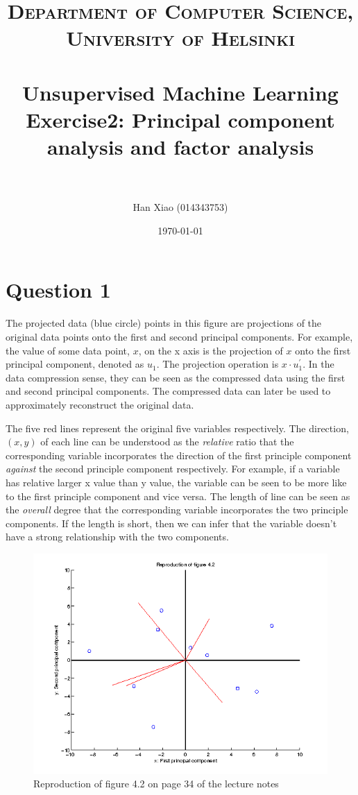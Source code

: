 \documentclass[paper=a4, fontsize=11pt]{scrartcl} %
\title{	
\normalfont \normalsize 
\textsc{Department of Computer Science, University of Helsinki} \\ [25pt] %
\horrule{0.5pt} \\[0.4cm] %
\huge Unsupervised Machine Learning \newline Exercise2: Principal component analysis and factor analysis \\ %
\horrule{2pt} \\[0.5cm] %
}
\author{Han Xiao (014343753)} %
\date{\normalsize\today} %
\numberwithin{equation}{section} %
\numberwithin{figure}{section} %
\numberwithin{table}{section} %
\begin{document}
\maketitle %


\section{Question 1}

The projected data (blue circle) points in this figure are projections of the original data points onto the first and second principal components. For example, the value of some data point, $x$, on the x axis is the projection of $x$ onto the first principal component, denoted as $u_1$. The projection operation is $x \cdot u_1^{'}$. In the data compression sense, they can be seen as the compressed data using the first and second principal components. The compressed data can later be used to approximately reconstruct the original data. \newline

The five red lines represent the original five variables respectively. The direction, $(x, y)$ of each line can be understood as the {\em relative} ratio that the corresponding variable incorporates the direction of the first principle component {\em against} the second principle component respectively. For example, if a variable has relative larger x value than y value, the variable can be seen to be more like to the first principle component and vice versa. The length of line can be seen as the {\em overall} degree that the corresponding variable incorporates the two principle components. If the length is short, then we can infer that the variable doesn't have a strong relationship with the two components.

\begin{figure}[H]
  \centering
  \includegraphics[scale=.7]{reproduct42}
  \caption{Reproduction of figure 4.2 on page 34 of the lecture notes}
\end{figure}
\end{document}
